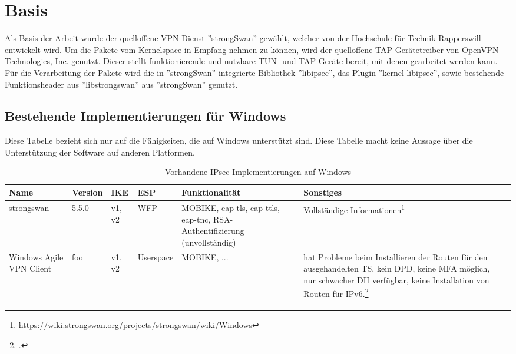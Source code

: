 


\section{Basis}
Als Basis der Arbeit wurde der quelloffene VPN-Dienst ''strongSwan'' gewählt,
welcher von der Hochschule für Technik Rapperswill entwickelt wird.
Um die Pakete vom Kernelspace in Empfang nehmen zu können, wird der quelloffene
TAP-Gerätetreiber von OpenVPN Technologies, Inc. genutzt. Dieser stellt funktionierende
und nutzbare TUN- und TAP-Geräte bereit, mit denen gearbeitet werden kann.
Für die Verarbeitung der Pakete wird die in ''strongSwan'' integrierte Bibliothek ''libipsec'',
das Plugin ''kernel-libipsec'', sowie bestehende Funktionsheader aus ''libstrongswan''
aus ''strongSwan'' genutzt.

\subsection{Bestehende Implementierungen für Windows}

Diese Tabelle bezieht sich nur auf die Fähigkeiten, die auf Windows unterstützt sind.
Diese Tabelle macht keine Aussage über die Unterstützung der Software auf anderen Platformen.
\begin{table}[h]
\caption{Vorhandene IPsec-Implementierungen auf Windows }
\begin{tabular*}{20cm}{|p{2cm}|p{2cm}|p{2cm}|p{2cm}|p{2cm}|p{4cm}|p{6cm}|}\firsthline
Name & Version & IKE & ESP & Funktionalität & Sonstiges \\ \hline 
strongswan & 5.5.0 & v1, v2 & \ac{WFP} & MOBIKE, eap-tls, eap-ttls, eap-tnc, RSA-Authentifizierung (unvollständig) & Vollständige Informationen\footnote{\url{https://wiki.strongswan.org/projects/strongswan/wiki/Windows}} \\ \hline 
Windows Agile VPN Client & foo & v1, v2 & Userspace & MOBIKE, ... & hat Probleme beim Installieren der Routen für den ausgehandelten \ac{TS}, kein \ac{DPD}, keine \ac{MFA} möglich, nur schwacher \ac{DH} verfügbar, keine Installation von Routen für IPv6.\footcite{_windows7_2016} \\ \hline 
\end{tabular*}
\label{tab:IPsec-Implementierungen}
\end{table}
